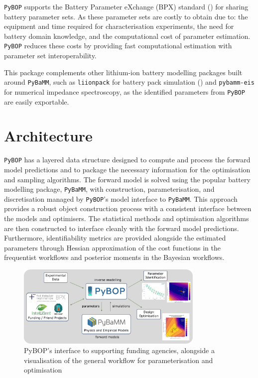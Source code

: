 \documentclass[
]{article}
\begin{document}
\texttt{PyBOP} supports the Battery Parameter eXchange (BPX) standard
() for sharing battery
parameter sets. As these parameter sets are costly to obtain due to: the
equipment and time required for characterisation experiments, the need
for battery domain knowledge, and the computational cost of parameter
estimation. \texttt{PyBOP} reduces these costs by providing fast
computational estimation with parameter set interoperability.

This package complements other lithium-ion battery modelling packages
built around \texttt{PyBaMM}, such as \texttt{liionpack} for battery
pack simulation () and
\texttt{pybamm-eis} for numerical impedance spectroscopy, as the
identified parameters from \texttt{PyBOP} are easily exportable.

\section{Architecture}\label{architecture}

\texttt{PyBOP} has a layered data structure designed to compute and
process the forward model predictions and to package the necessary
information for the optimisation and sampling algorithms. The forward
model is solved using the popular battery modelling package,
\texttt{PyBaMM}, with construction, parameterisation, and discretisation
managed by \texttt{PyBOP}'s model interface to \texttt{PyBaMM}. This
approach provides a robust object construction process with a consistent
interface between the models and optimisers. The statistical methods and
optimisation algorithms are then constructed to interface cleanly with
the forward model predictions. Furthermore, identifiability metrics are
provided alongside the estimated parameters through Hessian
approximation of the cost functions in the frequentist workflows and
posterior moments in the Bayesian workflows.

\begin{figure}
\centering
\includegraphics[width=0.8\textwidth,height=\textheight]{figures/PyBOP-high-level.pdf}
\caption{PyBOP's interface to supporting funding agencies, alongside a
visualisation of the general workflow for parameterisation and
optimisation \label{fig:high-level}}
\end{figure}
\end{document}

